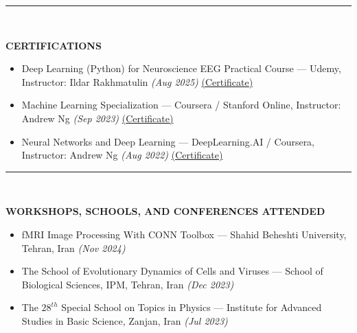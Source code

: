 \documentclass[12pt, b4paper]{cv}
\begin{document}
\vspace{-0.15in}
\rule{\textwidth}{1pt}\\
\vspace{-0.15in}

{\Large \textbf{CERTIFICATIONS}}
\vspace{-5pt}

\begin{itemize}
    \item Deep Learning (Python) for Neuroscience EEG Practical Course — Udemy, Instructor: Ildar Rakhmatulin \textit{(Aug 2025)}
          \href{https://www.udemy.com/certificate/UC-1c61cc70-1c1f-49fc-b6b1-972fa68f97df/}{(Certificate)}
    \item Machine Learning Specialization — Coursera / Stanford Online, Instructor: Andrew Ng \textit{(Sep 2023)}
          \href{https://coursera.org/share/73ec39657746dc6a319fa5a123047ccf}{(Certificate)}
    \item Neural Networks and Deep Learning — DeepLearning.AI / Coursera, Instructor: Andrew Ng \textit{(Aug 2022)}
          \href{https://coursera.org/share/601e36dd06712caa01ff9b867a6bf7a7}{(Certificate)}
\end{itemize}



\vspace{-0.15in}
\rule{\textwidth}{1pt}\\
\vspace{-0.15in}

{\Large \textbf{WORKSHOPS, SCHOOLS, AND CONFERENCES ATTENDED}}
\vspace{-5pt}

\begin{itemize}
    \item fMRI Image Processing With CONN Toolbox — Shahid Beheshti University, Tehran, Iran \textit{(Nov 2024)}
    \item The School of Evolutionary Dynamics of Cells and Viruses — School of Biological Sciences, IPM, Tehran, Iran \textit{(Dec 2023)}
    \item The $28^{th}$ Special School on Topics in Physics — Institute for Advanced Studies in Basic Science, Zanjan, Iran \textit{(Jul 2023)}
\end{itemize}
\end{document}
